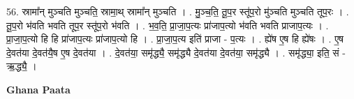 \documentclass[17pt]{extarticle}
\begin{document}
56. स्रामा᳚न् मुञ्चति मुञ्चति॒ स्रामा॒थ् स्रामा᳚न् मुञ्चति । . मु॒ञ्च॒ति॒ तू॒प॒र स्तू॑प॒रो मु॑ञ्चति मुञ्चति तूप॒रः । . तू॒प॒रो भ॑वति भवति तूप॒र स्तू॑प॒रो भ॑वति । . भ॒व॒ति॒ प्रा॒जा॒प॒त्यः प्रा॑जाप॒त्यो भ॑वति भवति प्राजाप॒त्यः । . प्रा॒जा॒प॒त्यो हि हि प्रा॑जाप॒त्यः प्रा॑जाप॒त्यो हि । . प्रा॒जा॒प॒त्य इति॑ प्राजा - प॒त्यः । . ह्ये॑ष ए॒ष हि ह्ये॑षः । . ए॒ष दे॒वत॑या दे॒वत॑यै॒ष ए॒ष दे॒वत॑या । . दे॒वत॑या॒ समृ॑द्ध्यै॒ समृ॑द्ध्यै दे॒वत॑या दे॒वत॑या॒ समृ॑द्ध्यै । . समृ॑द्ध्या॒ इति॒ सं - ऋ॒द्ध्यै॒ । \newline

\textbf{Ghana Paata } \newline
\end{document}
